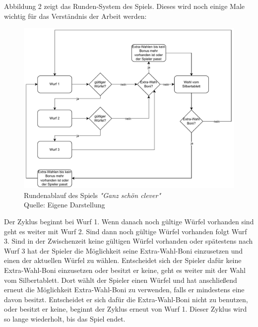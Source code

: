 Abbildung 2 zeigt das Runden-System des Spiels. Dieses wird noch einige Male wichtig für das Verständnis der Arbeit werden:
	\nopagebreak
\begin{figure}[H]
	\includegraphics[width=1\textwidth]{Bilder/RundenablaufF.drawio} 
	\caption[Rundenablauf des Spiels \textit{"Ganz schön clever"}]{Rundenablauf des Spiels \textit{"Ganz schön clever"}\\ Quelle: Eigene Darstellung}
\end{figure}

Der Zyklus beginnt bei Wurf 1. Wenn danach noch gültige Würfel vorhanden sind geht es weiter mit Wurf 2. Sind dann noch gültige Würfel vorhanden folgt Wurf 3. Sind in der Zwischenzeit keine gültigen Würfel vorhanden oder spätestens nach Wurf 3 hat der Spieler die Möglichkeit seine Extra-Wahl-Boni einzusetzen und einen der aktuellen Würfel zu wählen. Entscheidet sich der Spieler dafür keine Extra-Wahl-Boni einzusetzen oder besitzt er keine, geht es weiter mit der Wahl vom Silbertablett. Dort wählt der Spieler einen Würfel und hat anschließend erneut die Möglichkeit Extra-Wahl-Boni zu verwenden, falls er mindestens eine davon besitzt. Entscheidet er sich dafür die Extra-Wahl-Boni nicht zu benutzen, oder besitzt er keine, beginnt der Zyklus erneut von Wurf 1. Dieser Zyklus wird so lange wiederholt, bis das Spiel endet.\\

